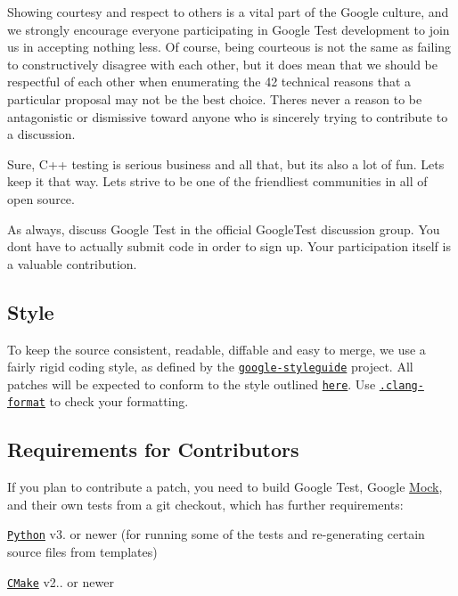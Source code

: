 Showing courtesy and respect to others is a vital part of the Google culture, and we strongly encourage everyone participating in Google Test development to join us in accepting nothing less. Of course, being courteous is not the same as failing to constructively disagree with each other, but it does mean that we should be respectful of each other when enumerating the 42 technical reasons that a particular proposal may not be the best choice. There\textquotesingle{}s never a reason to be antagonistic or dismissive toward anyone who is sincerely trying to contribute to a discussion.

Sure, C++ testing is serious business and all that, but it\textquotesingle{}s also a lot of fun. Let\textquotesingle{}s keep it that way. Let\textquotesingle{}s strive to be one of the friendliest communities in all of open source.

As always, discuss Google Test in the official Google\+Test discussion group. You don\textquotesingle{}t have to actually submit code in order to sign up. Your participation itself is a valuable contribution.

\subsection*{Style}

To keep the source consistent, readable, diffable and easy to merge, we use a fairly rigid coding style, as defined by the \href{https://github.com/google/styleguide}{\tt google-\/styleguide} project. All patches will be expected to conform to the style outlined \href{https://google.github.io/styleguide/cppguide.html}{\tt here}. Use \href{https://github.com/google/googletest/blob/main/.clang-format}{\tt .clang-\/format} to check your formatting.

\subsection*{Requirements for Contributors}

If you plan to contribute a patch, you need to build Google Test, Google \mbox{\hyperlink{classMock}{Mock}}, and their own tests from a git checkout, which has further requirements\+:


\begin{DoxyItemize}
\item \href{https://www.python.org/}{\tt Python} v3. or newer (for running some of the tests and re-\/generating certain source files from templates)
\item \href{https://cmake.org/}{\tt C\+Make} v2.. or newer
\end{DoxyItemize}

